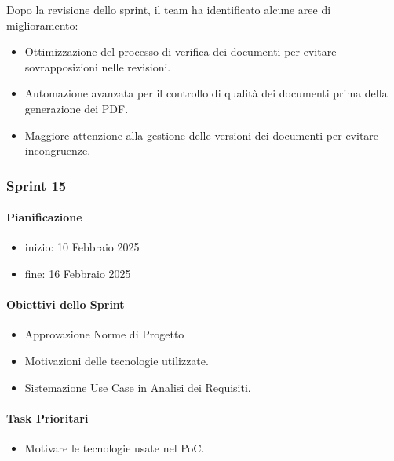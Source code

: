 \documentclass{article}
\begin{document}
                Dopo la revisione dello sprint, il team ha identificato alcune aree di miglioramento:
                \begin{itemize}
                    \item Ottimizzazione del processo di verifica dei documenti per evitare sovrapposizioni nelle revisioni.
                    \item Automazione avanzata per il controllo di qualità dei documenti prima della generazione dei PDF.
                    \item Maggiore attenzione alla gestione delle versioni dei documenti per evitare incongruenze.
                \end{itemize}
            \subsubsection{Sprint 15}
                \paragraph{Pianificazione}
                \begin{itemize}
                    \item inizio: 10 Febbraio 2025
                    \item fine: 16 Febbraio 2025
                \end{itemize}

                \paragraph{Obiettivi dello Sprint}
                    \begin{itemize}
                        \item Approvazione Norme di Progetto
                        \item Motivazioni delle tecnologie utilizzate.
                        \item Sistemazione Use Case in Analisi dei Requisiti.
                    \end{itemize}

                \paragraph{Task Prioritari}
                    \begin{itemize}
                        \item Motivare le tecnologie usate nel PoC.
                    \end{itemize}                
\end{document}
